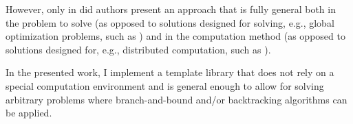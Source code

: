However, only in \cite{johnson1988modular} did authors present an approach that is fully
general both in the problem to solve (as opposed to solutions designed for solving, e.g., global
optimization problems, such as \cite{narkawicz2013formalnasa}) and in the computation method
(as opposed to solutions designed for, e.g., distributed computation, such as
\cite{voloshinov2017implementation, finkel1987distrib}).

In the presented work, I
implement a template library that does not rely
on a special computation environment and is general enough to allow for solving
arbitrary problems where branch-and-bound and/or backtracking algorithms can be applied.




